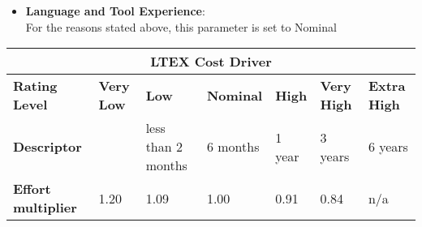 \begin{itemize}
\item \textbf{Language and Tool Experience}:\\
For the reasons stated above, this parameter is set to Nominal
\end{itemize}
\hspace*{-3cm}\begin{tabular}{|p{3cm}|p{2cm}|p{2cm}|p{2cm}|p{2cm}|p{2cm}|p{2cm}|}
\hline
\multicolumn{7}{|c|}{\textbf{LTEX Cost Driver}}\\
\hline
\hline
\textbf{Rating Level} & \textbf{Very Low} & \textbf{Low} & \textbf{Nominal} & \textbf{High} & \textbf{Very High} & \textbf{Extra High}\\
\hline
\textbf{Descriptor} & & less than 2 months & 6 months & 1 year & 3 years & 6 years & \\
\hline
\textbf{Effort multiplier} & 1.20 & 1.09 & 1.00 & 0.91 & 0.84 & n/a\\
\hline 
\end{tabular}

